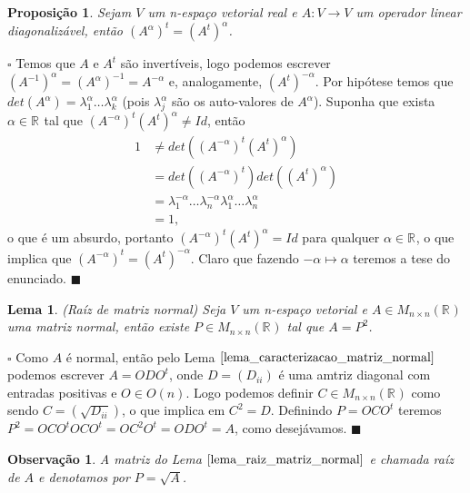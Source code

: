 \documentclass[12pt]{book}
\newtheorem{lema}[teorema]{Lema}
\newtheorem{observacao}[teorema]{Observação}
\newtheorem{proposicao}[teorema]{Proposição}
\newenvironment{prova}[1]{$\square$ #1}{\hfill$\blacksquare$}
\newcommand{\matrizortogonal}[1]{O(#1)}
\newcommand{\matrizquadreal}[1]{M_{#1 \times #1}(\real{})}
\newcommand{\real}[1]{\mathbb{R}^{#1}}
\begin{document}
	\begin{proposicao}\label{proposicao_transposta_potenciacao_matriz}
		Sejam $V$ um n-espaço vetorial real e $A:V\to V$ um operador linear diagonalizável, então $(A^{\alpha})^{t}=(A^{t})^{\alpha}$.
	\end{proposicao}
	\begin{prova}
		Temos que $A$ e $A^{t}$ são invertíveis, logo podemos escrever $(A^{-1})^{\alpha}=(A^{\alpha})^{-1}=A^{-\alpha}$ e, analogamente, $(A^{t})^{-\alpha}$. Por hipótese temos que $det(A^{\alpha}) = \lambda_{1}^{\alpha} \dots \lambda_{k}^{\alpha}$ (pois $\lambda_{j}^{\alpha}$ são os auto-valores de $A^{\alpha}$). Suponha que exista $\alpha \in \real{}$ tal que $(A^{-\alpha})^{t}(A^{t})^{\alpha} \neq Id$, então 
		$$
		\begin{aligned}
		1 &\neq det((A^{-\alpha})^{t}(A^{t})^{\alpha}) 
		\\
		&= det((A^{-\alpha})^{t})det((A^{t})^{\alpha})
		\\
		&= \lambda_{1}^{-\alpha} \dots \lambda_{n}^{-\alpha}\lambda_{1}^{\alpha} \dots \lambda_{n}^{\alpha}
		\\
		&=1,
		\end{aligned}
		$$
			o que é um absurdo, portanto $(A^{-\alpha})^{t}(A^{t})^{\alpha} =Id$ para qualquer $\alpha \in \real{}$, o que implica que $(A^{-\alpha})^{t}=(A^{t})^{-\alpha}$. Claro que fazendo $-\alpha \mapsto \alpha$ teremos a tese do enunciado.
	\end{prova}
	
	
	\begin{lema}\label{lema_raiz_matriz_normal}
		(Raíz de matriz normal) Seja $V$ um n-espaço vetorial e $A\in \matrizquadreal{n}$ uma matriz normal, então existe $P\in \matrizquadreal{n}$ tal que $A=P^{2}$. 
	\end{lema}
	\begin{prova}
		Como $A$ é normal, então pelo Lema $\ref{lema_caracterizacao_matriz_normal}$ podemos escrever $A=ODO^{t}$, onde $D=(D_{ii})$ é uma amtriz diagonal com entradas positivas e $O\in \matrizortogonal{n}$. Logo podemos definir $C \in \matrizquadreal{n}$ como sendo $C = (\sqrt{D_{ii}})$, o que implica em $C^{2} = D$. Definindo $P = OCO^{t}$ teremos $P^{2} = OCO^{t}OCO^{t} = OC^{2}O^{t} = ODO^{t}=A$, como desejávamos.
	\end{prova}
	
	\begin{observacao}\label{observacao_raiz_matriz_normal}
		A matriz do Lema $\ref{lema_raiz_matriz_normal}$ e chamada raíz de $A$ e denotamos por $P=\sqrt{A}$.
	\end{observacao}
	
\end{document}
